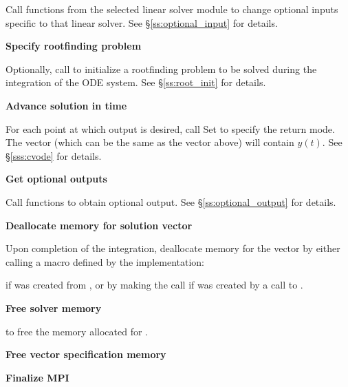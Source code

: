 \begin{Steps}
  Call  functions from the selected linear solver module to
  change optional inputs specific to that linear solver.
  See \S\ref{ss:optional_input} for details.

\item
  {\bf Specify rootfinding problem}

  Optionally, call  to initialize a rootfinding problem
  to be solved during the integration of the ODE system.
  See \S\ref{ss:root_init} for details.

\item
  {\bf Advance solution in time}

  For each point at which output is desired, call
  Set  to specify the return mode.
  The vector  (which can be the same as
  the vector  above) will contain $y(t)$.
  See \S\ref{sss:cvode} for details.
  
\item
  {\bf Get optional outputs}

  Call  functions to obtain optional output.
  See \S\ref{ss:optional_output} for details.

\item
  {\bf Deallocate memory for solution vector}

  Upon completion of the integration, deallocate memory for the vector 
  by either calling a macro defined by the {\nvector} implementation:

  {\s} 

  {\p} 

  if  was created from , or by making the call 
   if  was created by a call to .
  
\item
  {\bf Free solver memory}

   to free the memory allocated for {\cvode}.
  
\item
  {\bf Free vector specification memory}

  {\s} 

  {\p} 

\item 
  {\bf {\p} Finalize MPI}
  
\end{Steps}

